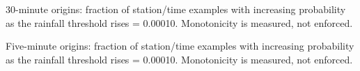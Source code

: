 \documentclass[11pt,a4paper]{article}
\begin{document}
\begin{table}[H]\centering\small
\caption{Main test classification at validation-selected operating points}
\end{table}
30-minute origins: fraction of station/time examples with increasing probability as the rainfall threshold rises = 0.00010. Monotonicity is measured, not enforced.

Five-minute origins: fraction of station/time examples with increasing probability as the rainfall threshold rises = 0.00010. Monotonicity is measured, not enforced.
\end{document}
